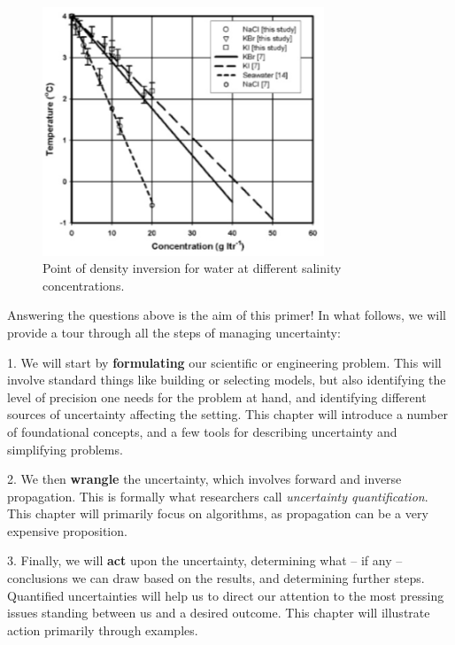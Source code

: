 \documentclass[../primer.tex]{subfiles}
\begin{document}
\begin{figure}[!ht]
  \includegraphics[width=0.75\textwidth]{./images/inversion_salt}
  \caption{Point of density inversion for water at different salinity
    concentrations.}
  \label{fig:inversion-salt}
\end{figure}

Answering the questions above is the aim of this primer! In what follows, we
will provide a tour through all the steps of managing uncertainty:

1. We will start by \textbf{formulating} our scientific or engineering problem.
This will involve standard things like building or selecting models, but also
identifying the level of precision one needs for the problem at hand, and
identifying different sources of uncertainty affecting the setting. This chapter
will introduce a number of foundational concepts, and a few tools for describing
uncertainty and simplifying problems.

2. We then \textbf{wrangle} the uncertainty, which involves forward and inverse
propagation. This is formally what researchers call \emph{uncertainty
  quantification}. This chapter will primarily focus on algorithms, as
propagation can be a very expensive proposition.

3. Finally, we will \textbf{act} upon the uncertainty, determining what -- if
any -- conclusions we can draw based on the results, and determining further
steps. Quantified uncertainties will help us to direct our attention to the most
pressing issues standing between us and a desired outcome. This chapter will
illustrate action primarily through examples.
\end{document}
